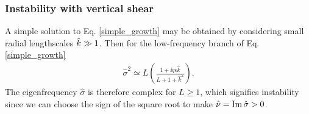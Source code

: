 \subsubsection{Instability with vertical shear}
A simple solution to Eq. \ref{simple_growth} may be obtained by
considering small radial lengthscales $\hat{k}\gg 1$. Then for the
low-frequency branch of Eq. \ref{simple_growth} 
\begin{align}
  \hat{\sigma}^2 \simeq L\left(\frac{1+\ii q \epsilon
       \hat{k}}{L+1+\hat{k}^2}\right).\label{simple_growth2}
\end{align}
The eigenfrequency $\hat{\sigma}$ is therefore complex for 
$L\geq1$, which signifies instability since we can choose
the sign of the square root to make $\hat{\nu} = \operatorname{Im}\hat{\sigma}>0$.   









